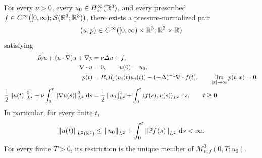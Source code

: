 \begin{samepage}
\begin{theorem}
\label{thm:ier-global-smoothness}
For every \(\nu>0\), every \(u_0\in H^\infty_\sigma(\mathbb R^3)\), and every prescribed
\(f\in C^\infty([0,\infty);\mathcal S(\mathbb R^3;\mathbb R^3))\), there exists a
pressure-normalized pair
\begin{equation}
 (u,p)\in C^\infty([0,\infty)\times\mathbb R^3;\mathbb R^3\times\mathbb R)
 \label{eq:ier-global-class}
\end{equation}
satisfying
\begin{align}
 \partial_tu+(u\cdot\nabla)u+\nabla p&=\nu\Delta u+f,
 \label{eq:ier-global-momentum}\\
 \nabla\cdot u&=0,
 \qquad u(0)=u_0,
 \label{eq:ier-global-divergence-datum}\\
 p(t)&=R_iR_j(u_i(t)u_j(t))-(-\Delta)^{-1}\nabla\cdot f(t),
 \qquad \lim_{|x|\to\infty}p(t,x)=0,
 \label{eq:ier-global-pressure}\\
 \frac12\left\lVert u(t)\right\rVert_{L^2}^2
 +\nu\int_0^t\left\lVert \nabla u(s)\right\rVert_{L^2}^2\,\mathrm d s
 &=\frac12\left\lVert u_0\right\rVert_{L^2}^2
 +\int_0^t\left\langle f(s),u(s)\right\rangle_{L^2}\,\mathrm d s,
 \qquad t\ge0.
 \label{eq:ier-global-energy}
\end{align}
In particular, for every finite \(t\),
\begin{equation}
 \left\lVert u(t)\right\rVert_{L^2(\mathbb R^3)}
 \le\left\lVert u_0\right\rVert_{L^2}+\int_0^t\left\lVert \mathbb P f(s)\right\rVert_{L^2}\,\mathrm d s<\infty.
 \label{eq:ier-global-energy-bound}
\end{equation}
For every finite \(T>0\), its restriction is the unique member of
\(\mathscr M_{\nu,f}^3(0,T;u_0)\).
\end{theorem}
\end{samepage}

